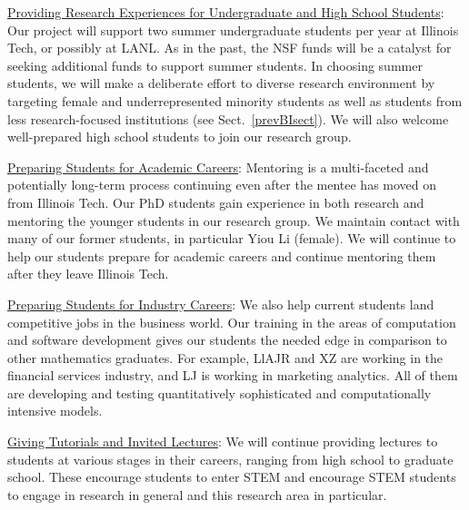 \documentclass[11pt]{NSFamsart}
\newcommand{\Upara}[1]{\noindent\underline{\upshape #1}:}
\begin{document}
\begin{sloppypar}\Upara{Providing Research Experiences for Undergraduate and High School Students} 
Our project will support two summer undergraduate students per year at Illinois Tech, or possibly at LANL. As in the past, the NSF funds will be a catalyst for seeking additional funds to support summer students. In choosing summer students, we will make a deliberate effort to diverse research environment by targeting female and underrepresented minority students as well as students from less research-focused institutions (see Sect.~\ref{prevBIsect}). We will also welcome well-prepared high school students to join our research group.\end{sloppypar}

\Upara{Preparing Students for Academic Careers} 
Mentoring is a multi-faceted and 
potentially long-term process continuing even after the mentee has moved on from Illinois Tech. 
Our PhD students gain experience in both research and mentoring the younger students in our research group. 
We maintain contact with many of our former students, in particular Yiou Li (female). We will continue to help our students prepare for academic careers and continue mentoring them after they leave Illinois Tech.

\Upara{Preparing Students for Industry Careers}
We also help current students land 
competitive jobs in the business world. Our training in the areas of computation and software 
development gives our students the needed edge in comparison to other mathematics 
graduates. For example, LlAJR and XZ are working in the financial services industry, and LJ is working in marketing analytics. All of them are developing and testing quantitatively sophisticated and computationally intensive models. 

\Upara{Giving Tutorials and Invited Lectures}
We will continue providing lectures to students at various stages in their careers, ranging from high school to graduate school. These encourage students to enter STEM and encourage STEM students 
to engage in research in general and this research area in particular.
\end{document}
